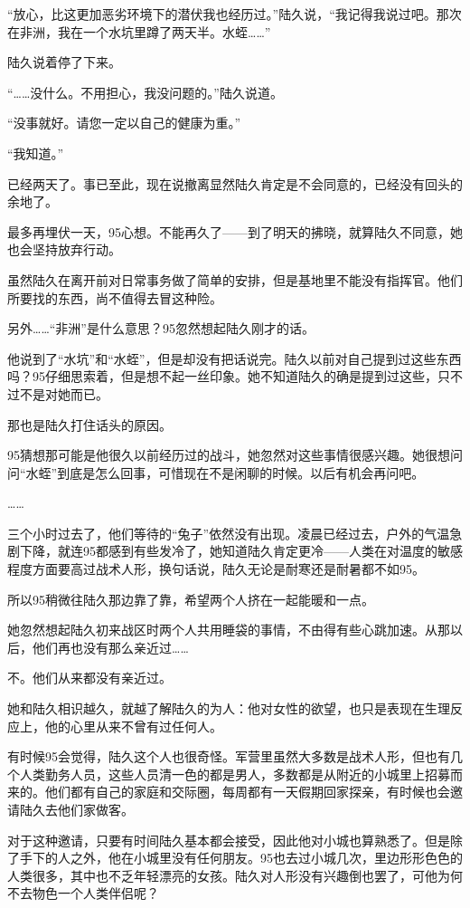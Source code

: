 “放心，比这更加恶劣环境下的潜伏我也经历过。”陆久说，“我记得我说过吧。那次在非洲，我在一个水坑里蹲了两天半。水蛭……”

陆久说着停了下来。

“……没什么。不用担心，我没问题的。”陆久说道。

“没事就好。请您一定以自己的健康为重。”

“我知道。”

已经两天了。事已至此，现在说撤离显然陆久肯定是不会同意的，已经没有回头的余地了。

最多再埋伏一天，95心想。不能再久了——到了明天的拂晓，就算陆久不同意，她也会坚持放弃行动。

虽然陆久在离开前对日常事务做了简单的安排，但是基地里不能没有指挥官。他们所要找的东西，尚不值得去冒这种险。

另外……“非洲”是什么意思？95忽然想起陆久刚才的话。

他说到了“水坑”和“水蛭”，但是却没有把话说完。陆久以前对自己提到过这些东西吗？95仔细思索着，但是想不起一丝印象。她不知道陆久的确是提到过这些，只不过不是对她而已。

那也是陆久打住话头的原因。

95猜想那可能是他很久以前经历过的战斗，她忽然对这些事情很感兴趣。她很想问问“水蛭”到底是怎么回事，可惜现在不是闲聊的时候。以后有机会再问吧。

……

三个小时过去了，他们等待的“兔子”依然没有出现。凌晨已经过去，户外的气温急剧下降，就连95都感到有些发冷了，她知道陆久肯定更冷——人类在对温度的敏感程度方面要高过战术人形，换句话说，陆久无论是耐寒还是耐暑都不如95。

所以95稍微往陆久那边靠了靠，希望两个人挤在一起能暖和一点。

她忽然想起陆久初来战区时两个人共用睡袋的事情，不由得有些心跳加速。从那以后，他们再也没有那么亲近过……

不。他们从来都没有亲近过。

她和陆久相识越久，就越了解陆久的为人：他对女性的欲望，也只是表现在生理反应上，他的心里从来不曾有过任何人。

有时候95会觉得，陆久这个人也很奇怪。军营里虽然大多数是战术人形，但也有几个人类勤务人员，这些人员清一色的都是男人，多数都是从附近的小城里上招募而来的。他们都有自己的家庭和交际圈，每周都有一天假期回家探亲，有时候也会邀请陆久去他们家做客。

对于这种邀请，只要有时间陆久基本都会接受，因此他对小城也算熟悉了。但是除了手下的人之外，他在小城里没有任何朋友。95也去过小城几次，里边形形色色的人类很多，其中也不乏年轻漂亮的女孩。陆久对人形没有兴趣倒也罢了，可他为何不去物色一个人类伴侣呢？


